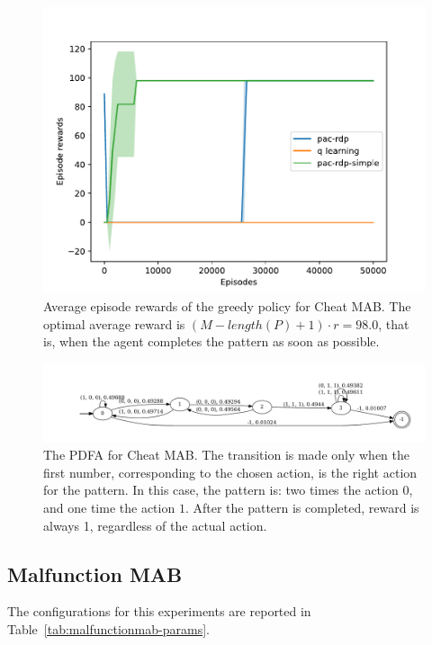 \documentclass{article}
\begin{document}
\begin{figure}[!h]
 \centering
 \includegraphics[width=\linewidth]{plot-cheatmab.pdf}
 \caption{Average episode rewards of the greedy policy for Cheat MAB.
 The optimal average reward is $(M - length(P) + 1)\cdot r = 98.0$,
 that is, when the agent completes the pattern as soon as possible.}
 \label{fig:cheatmab-experiment}
\end{figure}%
\begin{figure}[!h]
 \includegraphics[width=\linewidth]{pdfa-cheatmab-02-001.pdf}
 \caption{The PDFA for Cheat MAB. The
   transition is made only when the first number, corresponding
 to the chosen action, is the right action for the pattern.
 In this case, the pattern is: two times the action $0$, and
 one time the action $1$. After the pattern is completed, reward is always 1,
 regardless of the actual action.}
 \label{fig:cheatmab-pdfa}
\end{figure}

\pagebreak


\subsection{Malfunction MAB}

The configurations for this experiments are reported in
Table~\ref{tab:malfunctionmab-params}.
\end{document}
